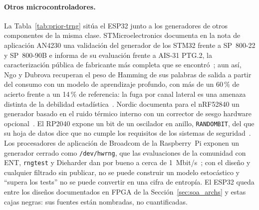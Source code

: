 \paragraph{Otros microcontroladores.} La Tabla~\ref{tab:prior-trng} sitúa
el ESP32 junto a los generadores de otros componentes de la misma clase.
STMicroelectronics documenta en la nota de aplicación AN4230 una
validación del generador de los STM32 frente a SP~800-22 y SP~800-90B e
informa de su evaluación frente a AIS-31 PTG.2, la caracterización
pública de fabricante más completa que se encontró~\cite{stm_an4230};
aun así, Ngo y Dubrova recuperan el peso de Hamming de sus palabras de
salida a partir del consumo con un modelo de aprendizaje profundo, con
más de un 60\,\% de acierto frente a un 14\,\% de referencia: la fuga por
canal lateral es una amenaza distinta de la debilidad
estadística~\cite{ngo_2022_sidechannel}. Nordic documenta para el
nRF52840 un generador basado en el ruido térmico interno con un corrector
de sesgo hardware opcional~\cite{nordic_nrf52840_rng}. El RP2040 expone
un bit de un oscilador en anillo, \texttt{RANDOMBIT}, del que su hoja de
datos dice que no cumple los requisitos de los sistemas de
seguridad~\cite{raspberrypi_rp2040_ds, dmo_2022_rp2040}. Los procesadores
de aplicación de Broadcom de la Raspberry~Pi exponen un generador cerrado
como \texttt{/dev/hwrng}, que las evaluaciones de la comunidad con ENT,
\texttt{rngtest} y Dieharder dan por bueno a cerca de
1~Mbit/s~\cite{russell_2013_rpi_hwrng}; con el diseño y cualquier filtrado
sin publicar, no se puede construir un modelo estocástico y ``supera los
tests'' no se puede convertir en una cifra de entropía. El ESP32 queda
entre los diseños documentados en FPGA de la Sección~\ref{sec:soa_archs}
y estas cajas negras: sus fuentes están nombradas, no cuantificadas.

